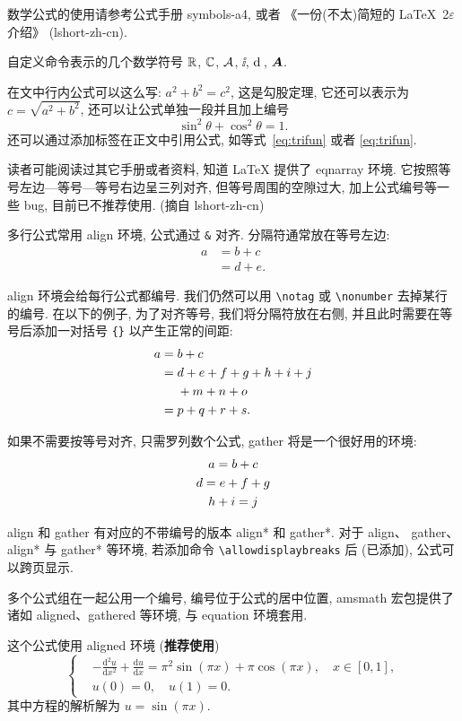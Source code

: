 数学公式的使用请参考公式手册 symbols-a4, 或者 《一份(不太)简短的 \LaTeX~2$\varepsilon$ 介绍》 (lshort-zh-cn).

自定义命令表示的几个数学符号 $\mathbb{R}$, $\mathbb{C}$, $\mathcal{A}$, $\ii$, $\mathrm{d}\,$, $\boldsymbol{A}$.

在文中行内公式可以这么写: $a^2+b^2=c^2$, 这是勾股定理, 它还可以表示为 $c=\sqrt{a^2+b^2}$, 还可以让公式单独一段并且加上编号
\begin{equation}\label{eq:trifun}
\sin^2{\theta}+\cos^2{\theta}=1.
\end{equation}
还可以通过添加标签在正文中引用公式, 如等式~\eqref{eq:trifun} 或者 \ref{eq:trifun}.

读者可能阅读过其它手册或者资料, 知道 LaTeX 提供了 eqnarray 环境. 它按照等号左边—等号—等号右边呈三列对齐, 但等号周围的空隙过大, 加上公式编号等一些 bug, 目前已不推荐使用. (摘自 lshort-zh-cn)

多行公式常用 align 环境, 公式通过 \verb|&| 对齐. 分隔符通常放在等号左边:
\begin{align}
a & = b + c \\
& = d + e.
\end{align}

align 环境会给每行公式都编号. 我们仍然可以用 \verb|\notag| 或 \verb|\nonumber| 去掉某行的编号. 在以下的例子,
为了对齐等号, 我们将分隔符放在右侧, 并且此时需要在等号后添加一对括号 \verb|{}| 以产生正常的间距:
\begin{align}
a ={} & b + c \\
={} & d + e + f + g + h + i + j \notag \\
& + m + n + o \\
={} & p + q + r + s.
\end{align}

如果不需要按等号对齐, 只需罗列数个公式, gather 将是一个很好用的环境:
\begin{gather}
a = b + c \\
d = e + f + g \notag \\
h + i = j
\end{gather}

align 和 gather 有对应的不带编号的版本 align* 和 gather*.
对于 align、 gather、align* 与 gather* 等环境, 若添加命令 \verb|\allowdisplaybreaks| 后 (已添加), 公式可以跨页显示.

多个公式组在一起公用一个编号, 编号位于公式的居中位置, amsmath 宏包提供了诸如 aligned、gathered 等环境, 与 equation 环境套用.

这个公式使用 aligned 环境 (\textbf{推荐使用})
\begin{equation}\label{eq:alignedEq}
\left\{\begin{aligned}
  &-\frac{\mathrm{d}^{2} u}{\mathrm{d} x^{2}}+\frac{\mathrm{d} u}{\mathrm{d} x}=\pi^{2} \sin (\pi x)+\pi \cos (\pi x),\quad x \in [0,1], \\
  &u(0)=0,\quad u(1)=0.
\end{aligned} \right.
\end{equation}
其中方程的解析解为 $u=\sin(\pi x)$.


